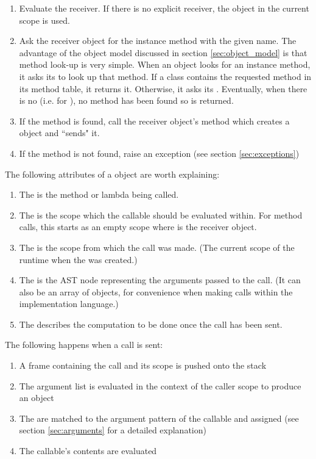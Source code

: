 \begin{enumerate}
  \item Evaluate the receiver. If there is no explicit receiver, the  object in the current scope is used.
  \item Ask the receiver object for the instance method with the given name. The advantage of the object model discussed in section \ref{sec:object_model} is that method look-up is very simple. When an object looks for an instance method, it asks its  to look up that method. If a class contains the requested method in its method table, it returns it. Otherwise, it asks its . Eventually, when there is no  (i.e. for ), no method has been found so  is returned.
  \item If the method is found, call the receiver object's  method which creates a  object and ``sends" it.
  \item If the method is not found, raise an exception (see section \ref{sec:exceptions})
\end{enumerate}

The following attributes of a  object are worth explaining:

\begin{enumerate}
  \item The  is the method or lambda being called.
  \item The  is the scope which the callable should be evaluated within. For method calls, this starts as an empty scope where  is the receiver object.
  \item The  is the scope from which the call was made. (The current scope of the runtime when the  was created.)
  \item The  is the  AST node representing the arguments passed to the call. (It can also be an array of objects, for convenience when making calls within the implementation language.)
  \item The  describes the computation to be done once the call has been sent.
\end{enumerate}

The following happens when a call is sent:

\begin{enumerate}
  \item A frame containing the call and its scope is pushed onto the stack
  \item The argument list is evaluated in the context of the caller scope to produce an  object
  \item The  are matched to the argument pattern of the callable and assigned (see section \ref{sec:arguments} for a detailed explanation)
  \item The callable's contents are evaluated
\end{enumerate}

